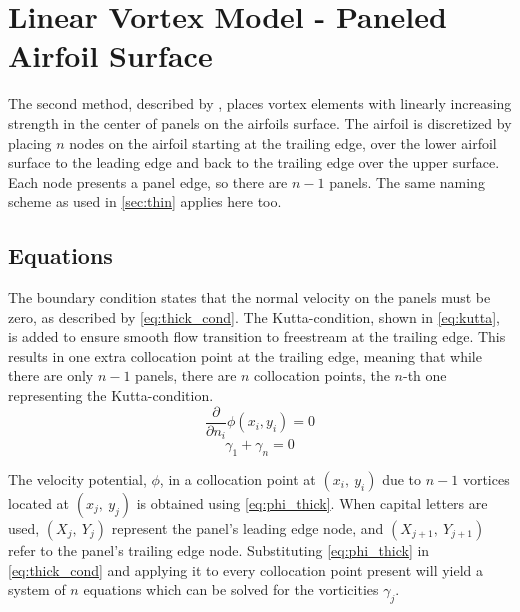 
\section{Linear Vortex Model - Paneled Airfoil Surface}
\label{sec:thick}
The second method, described by %
\citeauthor{kuethe_chow_1998}\cite{kuethe_chow_1998}, places vortex elements
with linearly increasing strength in the center of panels on the airfoils
surface. The airfoil is discretized by placing $n$ nodes on the airfoil starting
at the trailing edge, over the lower airfoil surface to the leading edge and
back to the trailing edge over the upper surface. Each node presents a panel
edge, so there are $n-1$ panels. The same naming scheme as used in
\autoref{sec:thin} applies here too.

\subsection{Equations}
\label{ssec:eq_thick}
The boundary condition states that the normal velocity on the panels
must be zero, as described by \autoref{eq:thick_cond}\cite{kuethe_chow_1998}.
The Kutta-condition, shown in \autoref{eq:kutta}, is
added to ensure smooth flow transition to freestream at the trailing edge. This
results in one extra collocation point at the trailing edge, meaning that while
there are only $n-1$ panels, there are $n$ collocation points, the $n$-th one
representing the Kutta-condition.
\begin{equation}
  \label{eq:thick_cond}
  \frac{\partial}{\partial n_{i}} \phi\left(x_{i}, y_{i}\right)=0
  \end{equation}
\begin{equation}
  \label{eq:kutta}
      \gamma_1 + \gamma_{n} = 0
\end{equation}

The velocity potential, $\phi$, in a collocation point at $(x_i,\: y_i)$ due
to $n-1$ vortices located at $(x_j, \: y_j)$ is obtained using
\autoref{eq:phi_thick}.
When capital letters are used, $(X_j, \: Y_j)$ represent the panel's leading edge
node, and $(X_{j+1}, \: Y_{j+1})$ refer to the panel's trailing edge node.
Substituting \autoref{eq:phi_thick} in \autoref{eq:thick_cond} and applying it
to every collocation point present will yield a system of $n$ equations which
can be solved for the vorticities $\gamma_j$.


